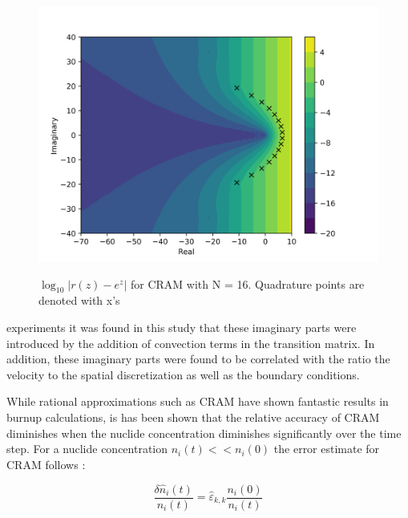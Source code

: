 \begin{figure}[p]
  \centering
  \includegraphics[width=5in]{images/chapter-3/RationApproxCRAMError16.png}\\
  \caption{$\log_{10}|r(z)-e^{z}|$ for CRAM with N = 16. Quadrature points are denoted with x's}
  \label{fig:complexRationalApproxCRAM}
\end{figure} 

\clearpage

\noindent experiments it was found in this study that these imaginary parts were introduced by the addition of convection terms in the transition matrix. In addition, these imaginary parts were found to be correlated with the ratio the velocity to the spatial discretization as well as the boundary conditions. 

While rational approximations such as CRAM have shown fantastic results in burnup calculations, is has been shown that the relative accuracy of CRAM diminishes when the nuclide concentration diminishes significantly over the time step. For a nuclide concentration $n_{i}(t) << n_{i}(0)$ the error estimate for CRAM follows \cite{isotalo2016}:

\begin{equation}
    \frac{\delta \hat{n}_{i}(t)}{n_{i}(t)} = \hat{\varepsilon}_{k,k} \frac{n_{i}(0)}{n_{i}(t)}
    \label{eq:CRAMError}
\end{equation}

